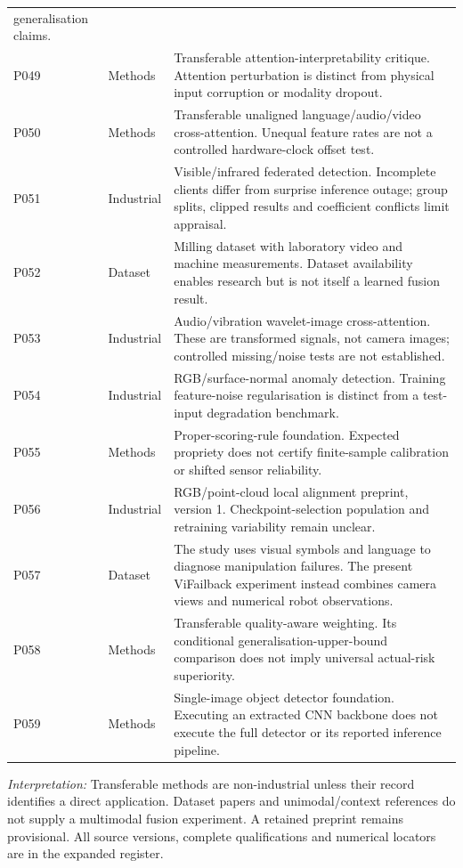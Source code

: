 \begin{longtable}{@{}P{.25\textwidth}P{.16\textwidth}P{.53\textwidth}@{}}
generalisation claims. \\
P049 \parencite{P049} & Methods & Transferable attention-interpretability critique.
Attention perturbation is distinct from physical input corruption or modality dropout.
\\
P050 \parencite{P050} & Methods & Transferable unaligned language/audio/video
cross-attention. Unequal feature rates are not a controlled hardware-clock offset test.
\\
P051 \parencite{P051} & Industrial & Visible/infrared federated detection. Incomplete
clients differ from surprise inference outage; group splits, clipped results and
coefficient conflicts limit appraisal. \\
P052 \parencite{Kim2026MSM} & Dataset & Milling dataset with laboratory video and machine
measurements. Dataset availability enables research but is not itself a learned fusion
result. \\
P053 \parencite{P053} & Industrial & Audio/vibration wavelet-image cross-attention. These
are transformed signals, not camera images; controlled missing/noise tests are not
established. \\
P054 \parencite{P054} & Industrial & RGB/surface-normal anomaly detection. Training
feature-noise regularisation is distinct from a test-input degradation benchmark. \\
P055 \parencite{P055} & Methods & Proper-scoring-rule foundation. Expected propriety does
not certify finite-sample calibration or shifted sensor reliability. \\
P056 \parencite{P056} & Industrial & RGB/point-cloud local alignment preprint, version 1.
Checkpoint-selection population and retraining variability remain unclear. \\
P057 \parencite{Zeng2026ViFailback} & Dataset & The study uses visual symbols and language
to diagnose manipulation failures. The present ViFailback experiment instead combines
camera views and numerical robot observations. \\
P058 \parencite{Zhang2023QMF} & Methods & Transferable quality-aware weighting. Its
conditional generalisation-upper-bound comparison does not imply universal actual-risk
superiority. \\
P059 \parencite{Zhao2024RTDETR} & Methods & Single-image object detector foundation.
Executing an extracted CNN backbone does not execute the full detector or its reported
inference pipeline. \\
\bottomrule\end{longtable}
\endgroup
\noindent\textit{Interpretation:} Transferable methods are non-industrial unless their
record identifies a direct application. Dataset papers and unimodal/context references
do not supply a multimodal fusion experiment. A retained preprint remains provisional.
All source versions, complete qualifications and numerical locators are in the expanded
register.
